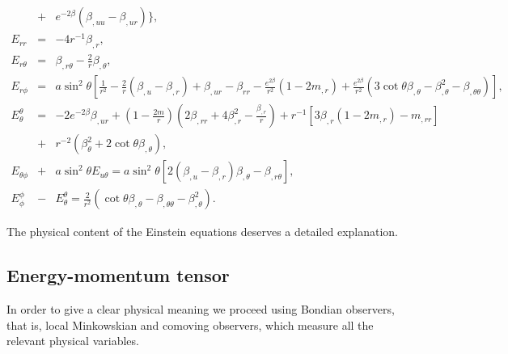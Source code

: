 \documentclass[twocolumn,superscriptaddress]{revtex4}
\begin{document}
\begin{widetext}
\begin{eqnarray}
&+& e^{-2\beta}(\beta_{,uu}-\beta_{,ur})\bigg\},\\
E_{rr}&=&-4r^{-1}\beta_{,r},\\
E_{r\theta}&=&\beta_{,r\theta}-\frac{2}{r}\beta_{,\theta},\\
E_{r\phi}&=&a\sin^2\theta\left[\frac{1}{r^2}-\frac{2}{r}\left(\beta_{,u}-\beta_{,r}\right)+\beta_{,ur}-\beta_{rr} -\frac{e^{2\beta}}{r^2}\left(1-2m_{,r}\right) + \frac{e^{2\beta}}{r^2}(3\cot\theta\beta_{,\theta}-\beta_{,\theta}^2-\beta_{,\theta\theta})\right],\\
E^\theta_\theta&=&-2e^{-2\beta}\beta_{,ur} + \left(1-\frac{2m}{r}\right)\left(2\beta_{,rr}+4\beta_{,r}^2-\frac{\beta_{,r}}{r}\right)+{r^{-1}}\left[3\beta_{,r}(1-2m_{,r})-m_{,rr}\right]\nonumber\\
&+&{r^{-2}}(\beta_{\theta}^2+2\cot\theta\beta_{,\theta}),\\
E_{\theta\phi}&+&a\sin^2\theta E_{u\theta}=a\sin^2\theta[2(\beta_{,u}-\beta_{,r})\beta_{,\theta}-\beta_{,r\theta}],\\
E_{\phi}^{\phi}&-&E_{\theta}^{\theta}=\frac{2}{r^2}(\cot\theta\beta_{,\theta}-\beta_{,\theta\theta}-\beta_{,\theta}^2).
\end{eqnarray}
\end{widetext}
The physical content of the Einstein equations deserves a detailed explanation.
\subsection{Energy-momentum tensor}
In order to give a clear physical meaning we proceed using Bondian observers, that is, local Minkowskian and comoving observers, which measure all the relevant physical variables. 
\end{document}
